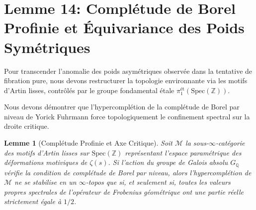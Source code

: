 \documentclass[
]{article}
\newtheorem{lemma}{Lemme}
\begin{document}
\section{Lemme 14: Complétude de Borel Profinie et Équivariance des Poids Symétriques}

Pour transcender l'anomalie des poids asymétriques observée dans la tentative de fibration pure, nous devons restructurer la topologie environnante via les motifs d'Artin lisses, contrôlés par le groupe fondamental étale $\pi_1^{\text{ét}}(\mathrm{Spec}(\mathbb{Z}))$.

Nous devons démontrer que l'hypercomplétion de la complétude de Borel par niveau de Yorick Fuhrmann force topologiquement le confinement spectral sur la droite critique.

\begin{lemma}[Complétude Profinie et Axe Critique]
Soit $\mathcal{M}$ la sous-$\infty$-catégorie des motifs d'Artin lisses sur $\mathrm{Spec}(\mathbb{Z})$ représentant l'espace paramétrique des déformations motiviques de $\zeta(s)$.
Si l'action du groupe de Galois absolu $G_{\mathbb{Q}}$ vérifie la condition de complétude de Borel par niveau, alors l'hypercomplétion de $\mathcal{M}$ ne se stabilise en un $\infty$-topos que si, et seulement si, toutes les valeurs propres spectrales de l'opérateur de Frobenius géométrique ont une partie réelle strictement égale à $1/2$.
\end{lemma}
\end{document}
